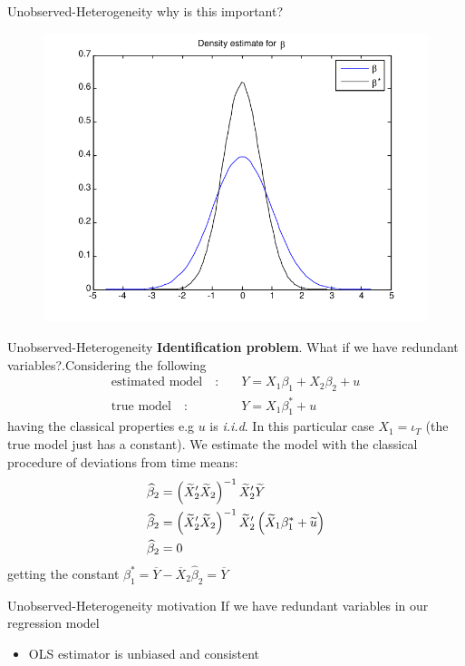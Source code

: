 \begin{frame}{Unobserved-Heterogeneity}	
	why is this important?
		\begin{figure}
			\centering
				\includegraphics[width = 0.6\linewidth]{figures/density.png}
		\end{figure}
\end{frame}
\begin{frame}{Unobserved-Heterogeneity}
	\textbf{Identification problem}. What if we have redundant variables?.Considering the following
		\begin{align*}
			\text{estimated model}\quad :& \quad Y=X_{1}\beta_{1}+X_{2}\beta_{2}+u \\
			\text{true model}\quad :& \quad Y=X_{1}\beta_{1}^{\ast}+u
		\end{align*}
	having the classical properties e.g $u$ is \emph{i.i.d}. In this particular case $X_{1}=\iota_{T}$ (the true model just has a constant). We estimate the model with the classical procedure of deviations from time means:
		\begin{align}
			\widehat{\beta}_{2} & = \left(\widetilde{X}_{2}^{\prime}\widetilde{X}_{2}\right)^{-1}\widetilde{X}_{2}^{\prime}\widetilde{Y} \notag \\
			\widehat{\beta}_{2} & = \left(\widetilde{X}_{2}^{\prime}\widetilde{X}_{2}\right)^{-1}\widetilde{X}_{2}^{\prime}\left(\widetilde{X}_{1}\beta_{1}^{\ast}+\widetilde{u}\right) \notag \\
			\widehat{\beta}_{2} & = 0
		\end{align}
	getting the constant $\beta_{1}^{\ast }=\overline{Y}-\overline{X}_{2}\widehat{\beta}_{2}=\overline{Y}$
\end{frame}
\begin{frame}{Unobserved-Heterogeneity motivation}
	If we have redundant variables in our regression model
		\begin{itemize}
			\item OLS estimator is unbiased and consistent
		\end{itemize}
\end{frame}
